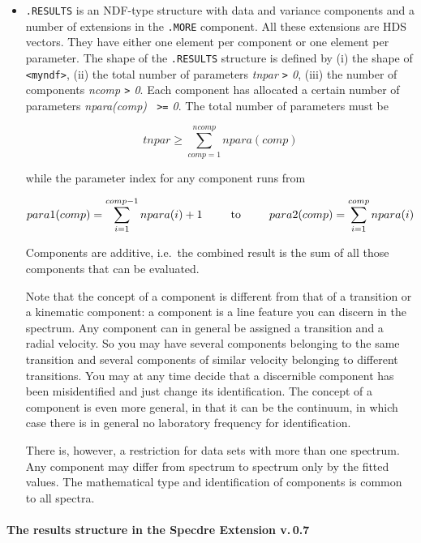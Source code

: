 \documentclass[11pt,twoside]{article}
\begin{document}
\begin{itemize}
\item{\tt .RESULTS} is an NDF-type structure with data and variance
   components and a number of extensions in the {\tt .MORE}
   component. All these extensions are HDS vectors. They have either one
   element per component or one element per parameter. The shape of the
   {\tt .RESULTS} structure is defined by (i) the shape of {\tt
   <myndf>}, (ii) the total number of parameters {\it tnpar {\tt>} 0},
   (iii) the number of components {\it ncomp {\tt>} 0}. Each component
   has allocated a certain number of parameters {\it npara(comp) {\tt
   >=} 0}. The total number of parameters must be

   \[tnpar\geq\sum_{comp=1}^{ncomp}npara(comp)\]

   while the parameter index for any component runs from

   \[para1(comp)=\sum_{i=1}^{comp-1}npara(i)+1
   \mbox{\phantom{mmm}to\phantom{mmm}}
   para2(comp)=\sum_{i=1}^{comp}npara(i)\]

   Components are additive, i.e.\ the combined result is the sum of all
   those components that can be evaluated.

   Note that the concept of a component is different from that of a
   transition or a kinematic component: a component is a line feature
   you can discern in the spectrum. Any component can in general be
   assigned a transition and a radial velocity. So you may have several
   components belonging to the same transition and several components of
   similar velocity belonging to different transitions. You may at any
   time decide that a discernible component has been misidentified and
   just change its identification. The concept of a component is even
   more general, in that it can be the continuum, in which case there is
   in general no laboratory frequency for identification.

   There is, however, a restriction for data sets with more than one
   spectrum. Any component may differ from spectrum to spectrum only by
   the fitted values. The mathematical type and identification of
   components is common to all spectra.

\end{itemize}


\paragraph{The results structure in the Specdre Extension v.\,0.7}
\end{document}
